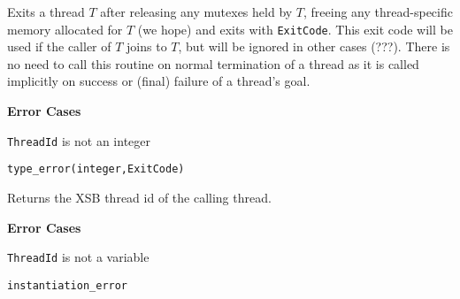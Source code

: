 \begin{description}
%
Exits a thread $T$ after releasing any mutexes held by $T$, freeing
any thread-specific memory allocated for $T$ (we hope) and exits with
{\tt ExitCode}.  This exit code will be used if the caller of $T$
joins to $T$, but will be ignored in other cases (???).  There is no
need to call this routine on normal termination of a thread as it is
called implicitly on success or (final) failure of a thread's goal.

{\bf Error Cases}
\bi
\item 	{\tt ThreadId} is not an integer
\bi
\item 	{\tt type\_error(integer,ExitCode)}
\ei
\ei

%
Returns the XSB thread id of the calling thread.

{\bf Error Cases}
\bi
\item 	{\tt ThreadId} is not a variable
\bi
\item 	{\tt instantiation\_error}
\ei
\ei
\end{description}

